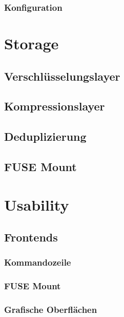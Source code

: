 \documentclass[11pt,ngerman,toc=listof,index=totoc]{scrreprt}
\begin{document}
\subsection{Konfiguration}\label{konfiguration}

\chapter{Storage}\label{storage}

\section{Verschlüsselungslayer}\label{verschluxfcsselungslayer}

\section{Kompressionslayer}\label{kompressionslayer}

\section{Deduplizierung}\label{deduplizierung}

\section{FUSE Mount}\label{fuse-mount}

\chapter{Usability}\label{usability}

\section{Frontends}\label{frontends}

\subsection{Kommandozeile}\label{kommandozeile}

\subsection{FUSE Mount}\label{fuse-mount-1}

\subsection{Grafische Oberflächen}\label{grafische-oberfluxe4chen}
\end{document}
